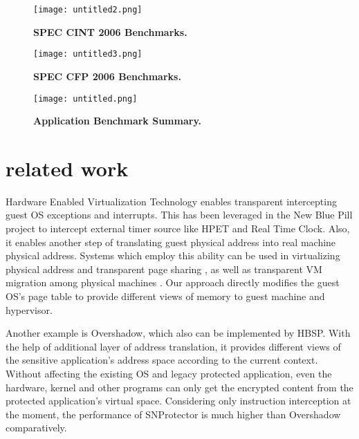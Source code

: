 \documentclass[conference]{IEEEtran}
\begin{document}
{\begin{figure}[!htb]
\begin{center}
\texttt{[image: untitled2.png]}
\end{center}
\caption{{\bf SPEC CINT 2006 Benchmarks.}} \label{Figure 6.}
\end{figure}

\begin{figure}[!htb]
\begin{center}
\texttt{[image: untitled3.png]}
\end{center}
\caption{{\bf SPEC CFP 2006 Benchmarks.}} \label{Figure 7.}
\end{figure}

\begin{figure}[!htb]
\begin{center}
\texttt{[image: untitled.png]}
\end{center}
\caption{{\bf Application Benchmark Summary.}} \label{Figure 8.}
\end{figure}





\bigskip

\section{related work}
Hardware Enabled Virtualization Technology enables transparent
intercepting guest OS exceptions and interrupts. This has been
leveraged in the New Blue Pill project to intercept external timer
source like HPET and Real Time Clock\cite{IEEEhowto:8}. Also, it
enables another step of translating guest physical address into
real machine physical address. Systems which employ this ability
can be used in virtualizing physical address\cite{IEEEhowto:9} and
transparent page sharing\cite{IEEEhowto:10} , as well as
transparent VM migration among physical machines
\cite{IEEEhowto:11}. Our approach directly modifies the guest OS's
page table to provide different views of memory to guest machine
and hypervisor.

Another example is Overshadow\cite{IEEEhowto:6}, which also can be
implemented by HBSP. With the help of additional layer of address
translation, it provides different views of the sensitive
application's address space according to the current context.
Without affecting the existing OS and legacy protected
application, even the hardware, kernel and other programs can only
get the encrypted content from the protected application's virtual
space. Considering only instruction interception at the moment,
the performance of SNProtector is much higher than Overshadow
comparatively.

}
\end{document}
